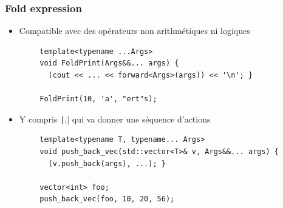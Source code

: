 \documentclass[C++.tex]{subfiles}
\begin{document}
\begin{frame}[fragile]
	\frametitle{Fold expression}
	\begin{itemize}
		\item Compatible avec des opérateurs non arithmétiques ni logiques
	\end{itemize}

	\begin{verbatim}
		template<typename ...Args>
		void FoldPrint(Args&&... args) {
		  (cout << ... << forward<Args>(args)) << '\n'; }

		FoldPrint(10, 'a', "ert"s);
	\end{verbatim}

	\begin{itemize}
		\item Y compris \og \texttt|,|\fg{} qui va donner une séquence d'actions
	\end{itemize}

	\begin{verbatim}
		template<typename T, typename... Args>
		void push_back_vec(std::vector<T>& v, Args&&... args) {
		  (v.push_back(args), ...); }

		vector<int> foo;
		push_back_vec(foo, 10, 20, 56);
	\end{verbatim}


\end{frame}
\end{document}
